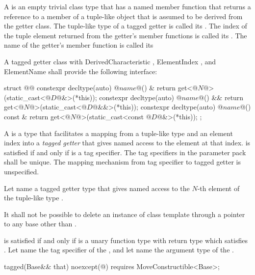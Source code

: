 {\pnum A  is an empty trivial class type that has a named member function that
returns a reference to a member of a tuple-like object that is assumed to be derived from the getter
class. The tuple-like type of a tagged getter is called its .
The index of the tuple element returned from the getter's member functions is called its
. The name of the getter's member function is called its

\pnum A tagged getter class with DerivedCharacteristic , ElementIndex
, and ElementName  shall provide the following interface:

\begin{codeblock}
struct @@ {
  constexpr decltype(auto) @$name$@() &       { return get<@$N$@>(static_cast<@$D$@&>(*this)); }
  constexpr decltype(auto) @$name$@() &&      { return get<@$N$@>(static_cast<@$D$@&&>(*this)); }
  constexpr decltype(auto) @$name$@() const & { return get<@$N$@>(static_cast<const @$D$@&>(*this)); }
};
\end{codeblock}

\pnum
A  is a type that facilitates a mapping from a tuple-like type and an
element index into a \textit{tagged getter} that gives named access to the element at that index.
 is satisfied if and only if  is a tag specifier. The tag specifiers in the
 parameter pack shall be unique. \enternote The mapping mechanism from tag specifier to
tagged getter is unspecified.\exitnote

\pnum Let  name a tagged getter type that gives named
access to the $N$-th element of the tuple-like type .

\pnum It shall not be possible to delete an instance of class template  through a
pointer to any base other than .

\pnum
{} is satisfied if and only if  is a unary function
type with return type  which satisfies . Let
 name the tag specifier of the  , and let
 name the argument type of the  .


\begin{itemdecl}
tagged(Base&& that) noexcept(@\seebelow@)
  requires MoveConstructible<Base>;
\end{itemdecl}

}
